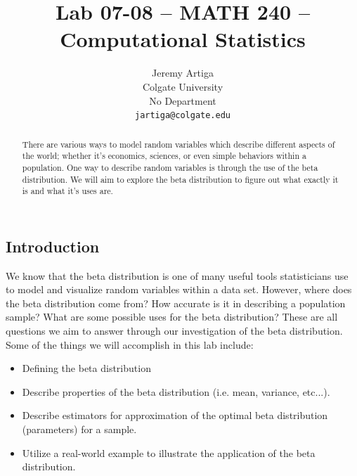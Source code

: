 \documentclass{article}\usepackage[]{graphicx}\usepackage[]{xcolor}
\begin{document}
\vspace{-1in}
\title{Lab 07-08 -- MATH 240 -- Computational Statistics}

\author{
  Jeremy Artiga \\
  Colgate University  \\
  No Department  \\
  {\tt jartiga@colgate.edu}
}

\date{}

\maketitle

\begin{multicols}{2}

\begin{abstract}
There are various ways to model random variables which describe different aspects of the world; whether it's economics, sciences, or even simple behaviors within a population. One way to describe random variables is through the use of the beta distribution. We will aim to explore the beta distribution to figure out what exactly it is and what it's uses are.
\end{abstract}

\section{Introduction}
We know that the beta distribution is one of many useful tools statisticians use to model and visualize random variables within a data set. However, where does the beta distribution come from? How accurate is it in describing a population sample? What are some possible uses for the beta distribution? These are all questions we aim to answer through our investigation of the beta distribution. \\

Some of the things we will accomplish in this lab include:
\begin{itemize}
  \item Defining the beta distribution
  \item Describe properties of the beta distribution (i.e. mean, variance, etc...).
  \item Describe estimators for approximation of the optimal beta distribution (parameters) for a sample.
  \item Utilize a real-world example to illustrate the application of the beta distribution.
\end{itemize}


\end{multicols}
\end{document}
